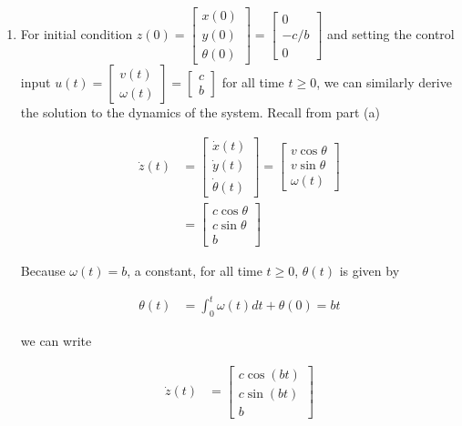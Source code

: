 \documentclass[11pt]{article}
\theoremstyle{definition}
\begin{document}
\begin{enumerate}
\begin{enumerate}
        \item %
        For initial condition $z(0) = \begin{bmatrix} x(0) \\ y(0) \\ \theta(0) \end{bmatrix} = \begin{bmatrix} 0 \\ -c/b \\ 0 \end{bmatrix}$ and setting the control input $u(t) = \begin{bmatrix} v(t) \\ \omega(t) \end{bmatrix} =  \begin{bmatrix} c \\ b \end{bmatrix}$ for all time $t \ge 0$, we can similarly derive the solution to the dynamics of the system.  Recall from part (a)

        \begin{align}
            \dot{z}(t) &= \begin{bmatrix} \dot{x}(t) \\ \dot{y}(t) \\ \dot{\theta}(t) \end{bmatrix} = \begin{bmatrix} v \cos\theta \\ v \sin\theta \\ \omega(t) \end{bmatrix} \\
            &= \begin{bmatrix} c \cos\theta \\ c \sin\theta \\ b \end{bmatrix}
        \end{align}

        Because $\omega(t) = b$, a constant, for all time $t \ge 0$, $\theta(t)$ is given by

        \begin{align}
            \theta(t) &= \int_0^t \omega(t)dt + \theta(0) = bt
        \end{align}

        we can write

        \begin{align}
            \dot{z}(t) &= \begin{bmatrix} c \cos(bt) \\ c \sin(bt) \\ b \end{bmatrix}
        \end{align}


\end{enumerate}
\end{enumerate}
\end{document}
